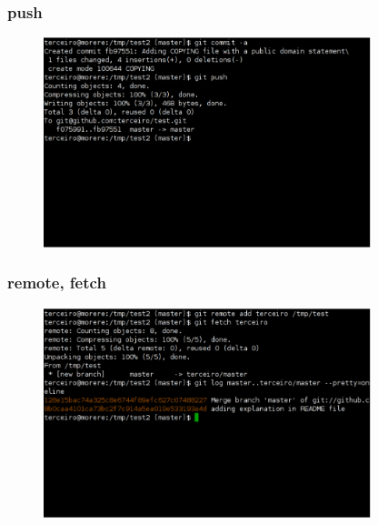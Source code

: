 \documentclass{beamer}
\begin{document}
\begin{frame}
  \frametitle{push}
  \begin{figure}[h]
    \begin{center}
      \includegraphics[width=0.85\textwidth]{figs/git-screenshot-push.pdf}
    \end{center}
    \label{fig:git-push}
  \end{figure}
\end{frame}

\begin{frame}
  \frametitle{remote, fetch}
  \begin{figure}[h]
    \begin{center}
      \includegraphics[width=0.85\textwidth]{figs/git-screenshot-remote-fetch.pdf}
    \end{center}
    \label{fig:git-remote-fetch}
  \end{figure}
\end{frame}

\end{document}
